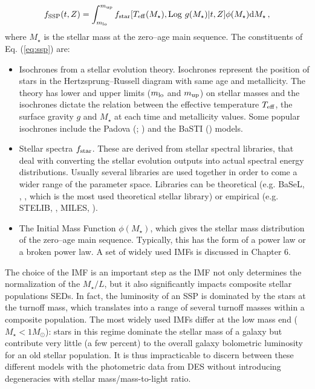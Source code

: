 \begin{equation}
f_{\rm SSP} (t,Z) = \int^{m_{\rm up}}_{m_{\rm lo}} f_{\rm star}[T_{\rm eff} (M_\star), {\rm Log} ~g(M_\star)|t,Z] \phi(M_\star) {\rm d} M_\star\, , \label{eq:ssp}
\end{equation}
where $M_\star$ is the stellar mass at the zero--age main sequence.
The constituents of Eq. (\ref{eq:ssp}) are:
\begin{itemize}
\item Isochrones from a stellar evolution theory. Isochrones represent the position of stars in the Hertzsprung--Russell diagram with same age and metallicity. The theory has lower and upper limits ($m_{\rm lo}$ and $m_{\rm up}$) on stellar masses and the isochrones dictate the relation between the effective temperature $T_{\rm eff}$, the surface gravity $g$ and $M_\star$ at each time and metallicity values. Some popular isochrones include the Padova (\citealt{bertelli}; \citealt{girardi}) and the BaSTI (\citealt{pietrinferni}) models.
\item Stellar spectra $f_{\rm star}$. These are derived from stellar spectral libraries, that deal with converting the stellar evolution outputs into actual spectral energy distributions. Usually several libraries are used together in order to come a wider range of the parameter space. Libraries can be theoretical (e.g. BaSeL, \citealt{basel1}, \citealt{basel2}, \citealt{basel3} which is the most used theoretical stellar library) or empirical (e.g. STELIB, \citealt{stelib}, MILES, \citealt{miles}).
\item The Initial Mass Function $\phi(M_\star)$, which gives the stellar mass distribution of the zero--age main sequence. Typically, this has the form of a power law or a broken power law. A set of widely used IMFs is discussed in Chapter 6.
\end{itemize}
The choice of the IMF is an important step as the IMF not only determines the normalization of the $M_\star/L$, but it also significantly impacts composite stellar populations SEDs. In fact, the luminosity of an SSP is dominated by the stars at the turnoff mass, which translates into a range of several turnoff masses within a composite population. The most widely used IMFs differ at the low mass end ($M_\star <1 M_\odot$): stars in this regime dominate the stellar mass of a galaxy but contribute very little (a few percent) to the overall galaxy bolometric luminosity for an old stellar population. It is thus impracticable to discern between these different models with the photometric data from DES without introducing degeneracies with stellar mass/mass-to-light ratio.

